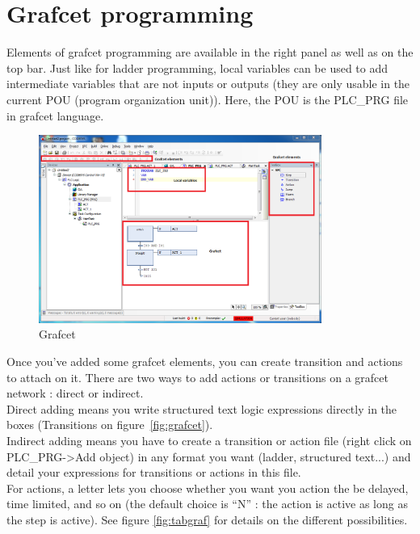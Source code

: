 \documentclass[10pt,a4paper]{article}
\begin{document}

\section{Grafcet programming}

Elements of grafcet programming are available in the right panel as well as on the top bar.
Just like for ladder programming, local variables can be used to add intermediate variables that are not inputs or outputs (they are only usable in the current POU (program organization unit)). Here, the POU is the PLC\_PRG file in grafcet language.

\begin{figure}[h!]
	\begin{center}
		\includegraphics[width=350px]{img13.PNG}
	\end{center}
\caption{Grafcet}
\label{fig:grafcet}
\end{figure}

Once you've added some grafcet elements, you can create transition and actions to attach on it.
There are two ways to add actions or transitions on a grafcet network : direct or indirect.\\
Direct adding means you write structured text logic expressions directly in the boxes (Transitions on figure~\vref{fig:grafcet}).\\
Indirect adding means you have to create a transition or action file (right click on PLC\_PRG->Add object) in any format you want (ladder, structured text...) and detail your expressions for transitions or actions in this file.\\
For actions, a letter lets you choose whether you want you action the be delayed, time limited, and so on (the default choice is ``N'' : the action is active as long as the step is active).
See figure \vref{fig:tabgraf} for details on the different possibilities.
\end{document}
